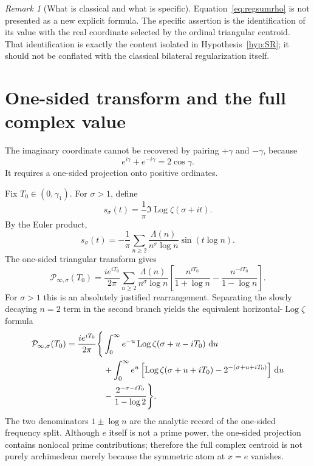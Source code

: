 \documentclass[11pt]{article}
\theoremstyle{definition}
\theoremstyle{remark}
\newtheorem{remark}[theorem]{Remark}
\newcommand{\dd}{\,\mathrm d}
\newcommand{\Log}{\operatorname{Log}}
\newcommand{\cP}{\mathcal P}
\begin{document}
\begin{remark}[What is classical and what is specific]
Equation~\eqref{eq:regsumrho} is not presented as a new explicit formula.  The specific assertion is the identification of its value with the real coordinate selected by the ordinal triangular centroid.  That identification is exactly the content isolated in Hypothesis~\ref{hyp:SR}; it should not be conflated with the classical bilateral regularization itself.
\end{remark}

\section{One-sided transform and the full complex value}\label{sec:imaginary}

The imaginary coordinate cannot be recovered by pairing $+\gamma$ and $-\gamma$, because
\[
e^{i\gamma}+e^{-i\gamma}=2\cos\gamma.
\]
It requires a one-sided projection onto positive ordinates.

Fix $T_0\in(0,\gamma_1)$.  For $\sigma>1$, define
\[
s_\sigma(t)=\frac1\pi\Im\Log\zeta(\sigma+it).
\]
By the Euler product,
\begin{equation}\label{eq:ssigma}
s_\sigma(t)
=-\frac1\pi\sum_{n\ge2}
\frac{\Lambda(n)}{n^\sigma\log n}\sin(t\log n).
\end{equation}
The one-sided triangular transform gives
\begin{equation}\label{eq:PsigmaPrime}
\cP_{\infty,\sigma}(T_0)
=
\frac{i e^{iT_0}}{2\pi}
\sum_{n\ge2}
\frac{\Lambda(n)}{n^\sigma\log n}
\left[
\frac{n^{iT_0}}{1+\log n}
-
\frac{n^{-iT_0}}{1-\log n}
\right].
\end{equation}
For $\sigma>1$ this is an absolutely justified rearrangement.  Separating the slowly decaying $n=2$ term in the second branch yields the equivalent horizontal-$\Log\zeta$ formula
\begin{align}
\cP_{\infty,\sigma}(T_0)
=\frac{i e^{iT_0}}{2\pi}\Bigg\{&
\int_0^\infty e^{-u}\Log\zeta(\sigma+u-iT_0)\,\dd u\notag\\
&+\int_0^\infty e^u\left[
\Log\zeta(\sigma+u+iT_0)-2^{-(\sigma+u+iT_0)}
\right]\dd u\notag\\
&-\frac{2^{-\sigma-iT_0}}{1-\log2}
\Bigg\}.
\label{eq:PsigmaLogzeta}
\end{align}
The two denominators $1\pm\log n$ are the analytic record of the one-sided frequency split.  Although $e$ itself is not a prime power, the one-sided projection contains nonlocal prime contributions; therefore the full complex centroid is not purely archimedean merely because the symmetric atom at $x=e$ vanishes.
\end{document}
